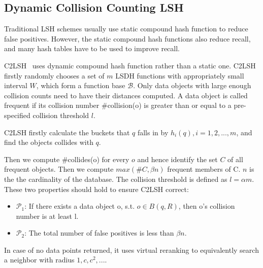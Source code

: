\subsection{Dynamic Collision Counting LSH}

Traditional LSH schemes usually use static compound hash function to reduce false positives.
However, the static compound hash functions also reduce recall, and many hash tables have to be used to improve recall.

C2LSH~\cite{gan2012locality} uses dynamic compound hash function rather than a static one.
C2LSH firstly randomly chooses a set of $m$ LSDH functions with appropriately small interval $W$, which form a function base $\mathcal{B}$.
Only data objects with large enough collision counts need to have their distances computed.
A data object is called frequent if its collision number \#collision(o) is greater than or equal to a pre-specified collision threshold $l$.

C2LSH firstly calculate the buckets that $q$ falls in by $h_i(q), i=1,2,...,m$, and find the objects collides with $q$.

Then we compute \#collides(o) for every $o$ and hence identify the set $C$ of all frequent objects. Then we compute $max(\#C, \beta n)$ frequent members of C. $n$ is the the cardinality of the database.
The collision threshold is defined as $l=\alpha m$.
These two properties should hold to ensure C2LSH correct:
\begin{itemize}
	\item $\mathcal{P}_1$: If there exists a data object o, s.t. $o\in B(q, R)$, then o's collision number is at least l. 
	\item $\mathcal{P}_2$: The total number of false positives is less than $\beta n$.
\end{itemize}

In case of no data points returned, it uses virtual reranking to equivalently search a neighbor with radius $1, c, c^2, ...$.